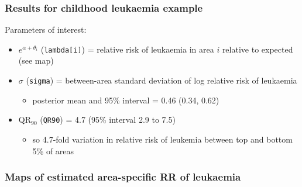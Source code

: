 \documentclass{beamer}
\newcommand{\bi}{\begin{itemize}}
\newcommand{\ei}{\end{itemize}}
\newcommand{\I}{\item}
\newcommand{\bibig}{\begin{itemize}}
\newcommand{\eibig}{\end{itemize}}
\begin{document}
\begin{frame}
\frametitle{Results for childhood leukaemia example}
Parameters of interest:\vspace{2mm}
\bibig
\I $e^{\alpha+\theta_i}$ ({\tt lambda[i]}) = relative risk of leukaemia in area $i$
relative to expected (see map)\vspace{2mm}
\I $\sigma$ ({\tt sigma}) = between-area standard deviation of log relative risk of leukaemia\vspace{1mm}
   \bi
  \I posterior mean and 95\% interval = 0.46 (0.34, 0.62)\vspace{2mm}
    \ei
\I QR$_{90}$ ({\tt QR90}) = 4.7 (95\% interval 2.9 to 7.5)\vspace{1mm}
  \bi
  \I so 4.7-fold variation in relative risk
      of leukemia between top and bottom 5\% of areas
  \ei
\eibig
\end{frame}

\begin{frame}
\frametitle{Maps of estimated area-specific RR of leukaemia}
\centerline{}
\end{frame}
\end{document}
